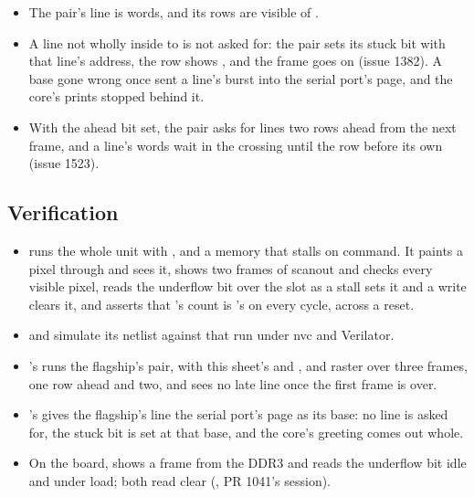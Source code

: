 \begin{itemize}
\item The pair's line is  words, and its rows are 
visible of .
\item A line not wholly inside  to  is not asked
for: the pair sets its stuck bit with that line's address, the row
shows , and the frame goes on (issue 1382). A base gone
wrong once sent a line's burst into the serial port's page, and the
core's prints stopped behind it.
\item With the ahead bit set, the pair asks for lines two rows ahead
from the next frame, and a line's words wait in the crossing until
the row before its own (issue 1523).
\end{itemize}

\subsection*{Verification}

\begin{itemize}
\item {} runs the whole unit with ,
 and a memory that stalls on command. It paints a
pixel through  and sees it, shows two frames of scanout and
checks every visible pixel, reads the underflow bit over the slot as a
stall sets it and a write clears it, and asserts that 's
count is 's on every cycle, across a reset.
\item {} and
 simulate its netlist against that
run under nvc and Verilator.
\item {}'s
\allowbreak
{} runs the flagship's pair, with this
sheet's  and , and raster over three frames, one row
ahead and two, and sees no late line once the first frame is over.
\item {}'s
\allowbreak
{} gives the flagship's line the serial
port's page as its base: no line is asked for, the stuck bit is set at
that base, and the core's greeting comes out whole.
\item On the board,  shows a frame from the DDR3 and
reads the underflow bit idle and under load; both read clear
(, PR 1041's session).
\end{itemize}

